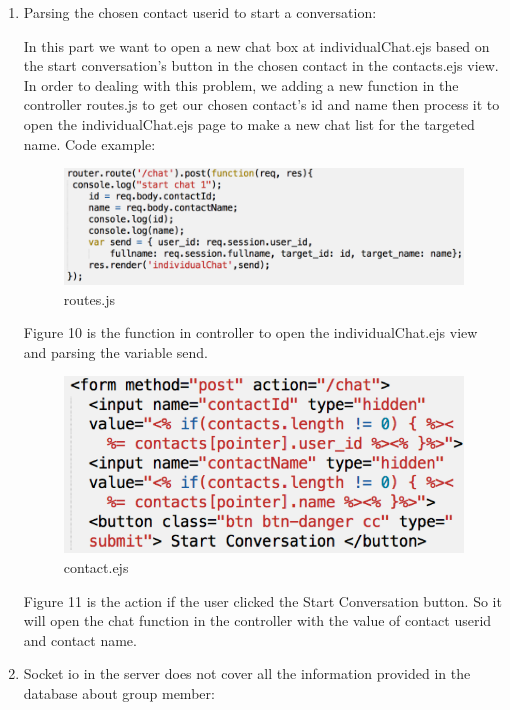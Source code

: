 \documentclass{article}
\begin{document}
\begin{enumerate}
\begin{enumerate}
		\item 
		Parsing the chosen contact userid to start a conversation:
		
		In this part we want to open a new chat box at individualChat.ejs based on the start conversation’s button in the chosen contact in the contacts.ejs view.
		In order to dealing with this problem, we adding a new function in the controller routes.js to get our chosen contact’s id and name then process it to open the individualChat.ejs page to make a new chat list for the targeted name.
		Code example:
		
		\begin{figure}[H]
			\centering
			\includegraphics[scale=0.4]{problemWeb2-1.png}
			\caption{routes.js}
		\end{figure}
		
		Figure 10 is the function in controller to open the individualChat.ejs view and parsing the variable send.
		
		\begin{figure}[H]
			\centering
			\includegraphics[scale=0.4]{problemWeb2-2.png}
			\caption{contact.ejs}
		\end{figure}
		
		Figure 11 is the action if the user clicked the Start Conversation button. So it will open the chat function in the controller with the value of contact userid and contact name.
		
		\item 
		Socket io in the server does not cover all the information provided in the database about group member:
		

\end{enumerate}
\end{enumerate}
\end{document}
